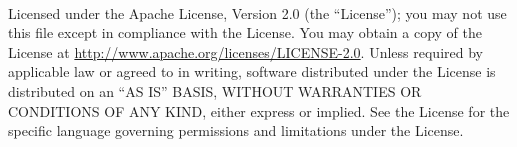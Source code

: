 

\newpage
~\vfill
\thispagestyle{empty}
\setlength{\parindent}{0pt}
\setlength{\parskip}{\baselineskip}

\begin{center}
    


\par Licensed under the Apache License, Version 2.0 (the ``License''); you may not
use this file except in compliance with the License. You may obtain a copy
of the License at \url{http://www.apache.org/licenses/LICENSE-2.0}. Unless
required by applicable law or agreed to in writing, software distributed
under the License is distributed on an ``AS IS'' BASIS, WITHOUT
WARRANTIES OR CONDITIONS OF ANY KIND, either express or implied. See the
License for the specific language governing permissions and limitations
under the License.

\end{center}
